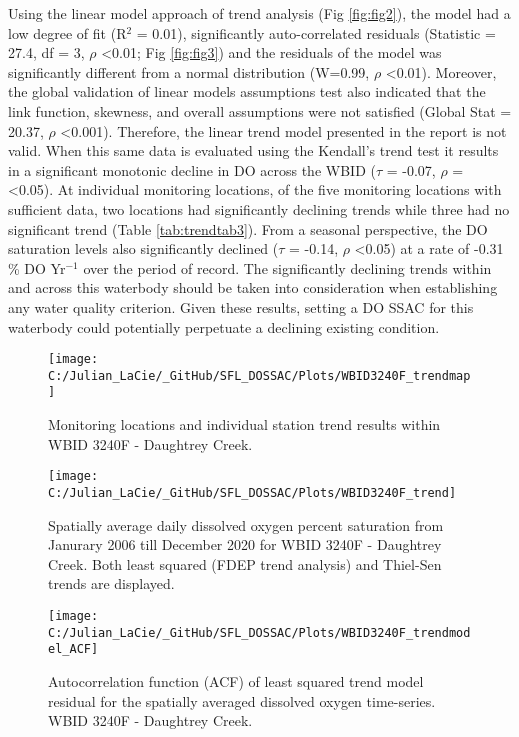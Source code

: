 \documentclass[]{interact}
\theoremstyle{plain}%
\theoremstyle{definition}
\theoremstyle{remark}
\begin{document}
Using the linear model approach of trend analysis (Fig \ref{fig:fig2}),
the model had a low degree of fit (R\(^{2}\) = 0.01), significantly
auto-correlated residuals (Statistic = 27.4, df = 3, \(\rho\)
\textless0.01; Fig \ref{fig:fig3}) and the residuals of the model was
significantly different from a normal distribution (W=0.99, \(\rho\)
\textless0.01). Moreover, the global validation of linear models
assumptions test also indicated that the link function, skewness, and
overall assumptions were not satisfied (Global Stat = 20.37, \(\rho\)
\textless0.001). Therefore, the linear trend model presented in the
report is not valid. When this same data is evaluated using the
Kendall's trend test it results in a significant monotonic decline in DO
across the WBID (\(\tau\) = -0.07, \(\rho\) = \textless0.05). At
individual monitoring locations, of the five monitoring locations with
sufficient data, two locations had significantly declining trends while
three had no significant trend (Table \ref{tab:trendtab3}). From a
seasonal perspective, the DO saturation levels also significantly
declined (\(\tau\) = -0.14, \(\rho\) \textless0.05) at a rate of -0.31
\% DO Yr\(^{-1}\) over the period of record. The significantly declining
trends within and across this waterbody should be taken into
consideration when establishing any water quality criterion. Given these
results, setting a DO SSAC for this waterbody could potentially
perpetuate a declining existing condition.

\begin{figure}[H]
\texttt{[image: C:/Julian\_LaCie/\_GitHub/SFL\_DOSSAC/Plots/WBID3240F\_trendmap]} \caption{\label{fig:mapfig1} Monitoring locations and individual station trend results within WBID 3240F - Daughtrey Creek.}\label{fig:unnamed-chunk-3}
\end{figure}

\begin{figure}[H]
\texttt{[image: C:/Julian\_LaCie/\_GitHub/SFL\_DOSSAC/Plots/WBID3240F\_trend]} \caption{\label{fig:fig2} Spatially average daily dissolved oxygen percent saturation from Janurary 2006 till December 2020 for  WBID 3240F - Daughtrey Creek. Both least squared (FDEP trend analysis) and Thiel-Sen trends are displayed.}\label{fig:unnamed-chunk-4}
\end{figure}

\begin{figure}[H]

{\centering \texttt{[image: C:/Julian\_LaCie/\_GitHub/SFL\_DOSSAC/Plots/WBID3240F\_trendmodel\_ACF]} 

}

\caption{\label{fig:fig3} Autocorrelation function (ACF) of least squared trend model residual for the spatially averaged dissolved oxygen time-series. WBID 3240F - Daughtrey Creek.}\label{fig:unnamed-chunk-5}
\end{figure}
\end{document}
